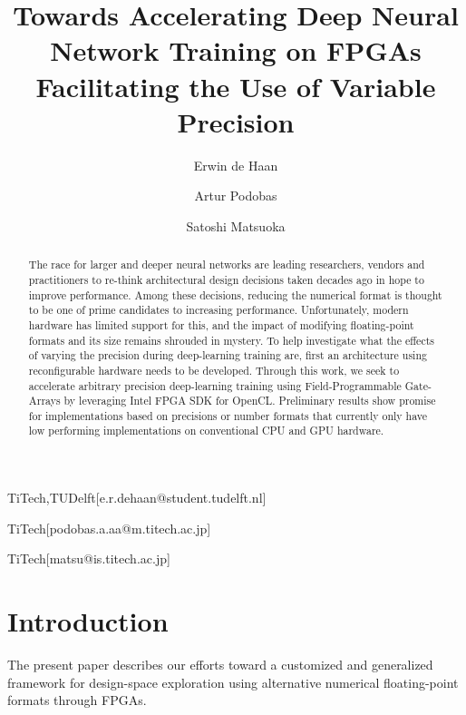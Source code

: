 \documentclass[techrep,english]{ipsj} %
\begin{document}
\title{Towards Accelerating Deep Neural Network Training on FPGAs Facilitating the Use of Variable Precision}


\author{Erwin de Haan}{TiTech,TUDelft}[e.r.dehaan@student.tudelft.nl]
\author{Artur Podobas}{TiTech}[podobas.a.aa@m.titech.ac.jp]
\author{Satoshi Matsuoka}{TiTech}[matsu@is.titech.ac.jp]

\begin{abstract}
The race for larger and deeper neural networks are leading researchers, vendors and practitioners to re-think architectural design decisions taken decades ago in hope to improve performance.
Among these decisions, reducing the numerical format is thought to be one of prime candidates to increasing performance.
Unfortunately, modern hardware has limited support for this, and the impact of modifying floating-point formats and its size remains shrouded in mystery.
To help investigate what the effects of varying the precision during deep-learning training are, first an architecture using reconfigurable hardware needs to be developed.
Through this work, we seek to accelerate arbitrary precision deep-learning training using Field-Programmable Gate-Arrays by leveraging Intel FPGA SDK for OpenCL.
Preliminary results show promise for implementations based on precisions or number formats that currently only have low performing implementations on conventional CPU and GPU hardware.
\end{abstract}


\maketitle

\section{Introduction}
The present paper describes our efforts toward a customized and generalized framework for design-space exploration using alternative numerical floating-point formats through FPGAs.
\end{document}
